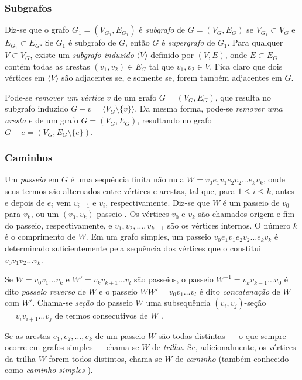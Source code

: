 \subsubsection{Subgrafos}

Diz-se que o grafo $G_1 = (V_{G_1}, E_{G_1})$ é \textit{subgrafo} de $G = (V_G, E_G)$ se $V_{G_1} \subset V_G$ e $E_{G_1} \subset E_G$. Se $G_1$ é subgrafo de $G$, então $G$ é \textit{supergrafo} de $G_1$. Para qualquer $V \subset V_G$, existe um \textit{subgrafo induzido} $\langle V \rangle$ definido por $(V, E)$, onde $E \subset E_G$ contém todas as arestas $(v_1, v_2) \in E_G$ tal que $v_1, v_2 \in V$. 
Fica claro que dois vértices em $\langle V \rangle$ são adjacentes se, e somente se, forem também adjacentes em $G$.

Pode-se \textit{remover um vértice} $v$ de um grafo $G = (V_G, E_G)$, que resulta no subgrafo induzido $G - v = \langle V_G \setminus \{v\}\rangle$. Da mesma forma, pode-se \textit{remover uma aresta} $e$ de um grafo $G = (V_G, E_G)$, resultando no grafo $G-e = (V_G, E_G \setminus \{e\})$.

\subsubsection{Caminhos}

Um \textit{passeio} em $G$ é uma sequência finita não nula $W = v_0e_1v_1e_2v_2\dots e_kv_k$, onde seus termos são alternados entre vértices e arestas, tal que, para $1\leq i \leq k$, antes e depois de $e_i$ vem $v_{i-1}$ e $v_i$, respectivamente. Diz-se que $W$ é um passeio de $v_0$ para $v_k$, ou um $(v_0,v_k)$-passeio \cite{graphTheoryApplicationsBondy}. Os vértices $v_0$ e $v_k$ são chamados origem e fim do passeio, respectivamente, e $v_1,v_2,\dots,v_{k-1}$ são os vértices internos. O número $k$ é o comprimento de $W$. 
Em um grafo simples, um passeio $v_0e_1v_1e_2v_2\dots e_kv_k$ é determinado suficientemente pela sequência dos vértices que o constitui $v_0v_1v_2\dots v_k$.

Se $W=v_0v_1\dots v_k$ e $W' = v_kv_{k+1}\dots v_l$ são passeios, o passeio $W^{-1} = v_kv_{k-1}\dots v_0$ é dito \textit{passeio reverso} de $W$ e o passeio $WW' = v_0v_1\dots v_l$ é dito \textit{concatenação} de $W$ com $W'$. Chama-se \textit{seção} do passeio $W$ uma subsequência $(v_i,v_j)$-seção $= v_iv_{i+1}\dots v_j$ de termos consecutivos de $W$ \cite{graphTheoryApplicationsBondy}. 

Se as arestas $e_1,e_2,\dots,e_k$ de um passeio $W$ são todas distintas --- o que sempre ocorre em grafos simples --- chama-se $W$ de \textit{trilha}.  Se, adicionalmente, os vértices da trilha $W$ forem todos distintos, chama-se $W$ de \textit{caminho} (também conhecido como \textit{caminho simples} \cite{grafosPremioElon}).

